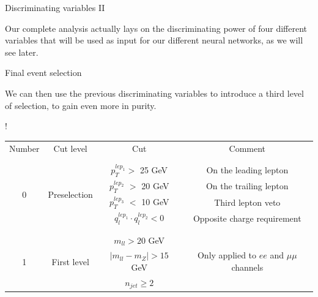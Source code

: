 \documentclass[8 pt]{beamer}
\begin{document}
\begin{frame}{Discriminating variables II}
\begin{minipage}[c]{.48\linewidth}
	\end{minipage} \vfill

	\begin{block}{}
	\justifying
	Our complete analysis actually lays on the discriminating power of four different variables that will be used as input for our different neural networks, as we will see later. \end{block} \vfill

\end{frame}


\begin{frame}{Final event selection}

	\justifying
	We can then use the previous discriminating variables to introduce a third level of selection, to gain even more in purity. \vfill 

	\hspace{4pt}
   \begin{minipage}[c]{.02\linewidth}
	\begin{exampleblock}{}  \end{exampleblock}
   \end{minipage}	
   \hspace{2pt}
   \begin{minipage}[c]{.97\linewidth}
   \begin{center}
   \resizebox{300pt} {!}{
   \begin{tabular}{c|c|c|c}
   Number & Cut level & Cut & Comment \\
   	& & & \\
   	\hline \hline
	& & & \\
	  \multirow{4}{*}{0} & \multirow{4}{*}{Preselection} & $p_{T}^{lep_1} >$ 25 GeV & On the leading lepton\\ 
	  & & $p_{T}^{lep_2}$ $>$ 20 GeV & On the trailing lepton \\ 
	  & & $p_{T}^{lep_3}$ $<$ 10 GeV &Third lepton veto \\ 
	  & & $q_{l}^{lep_1} \cdot q_{l}^{lep_2} < 0$ & Opposite charge requirement \\ 
	  & & & \\
	  \hline
	   & & & \\
	  \multirow{4}{*}{1} & \multirow{4}{*}{First level} & $m_{ll} > 20$ GeV &  \\
	  & & $|m_{ll} - m_Z| > 15$ GeV & Only applied to $ee$ and $\mu \mu$ channels \\
	  & & $n_{jet} \geq 2$ &  \\

\end{tabular}}
\end{center}
\end{minipage}
\end{frame}
\end{document}
